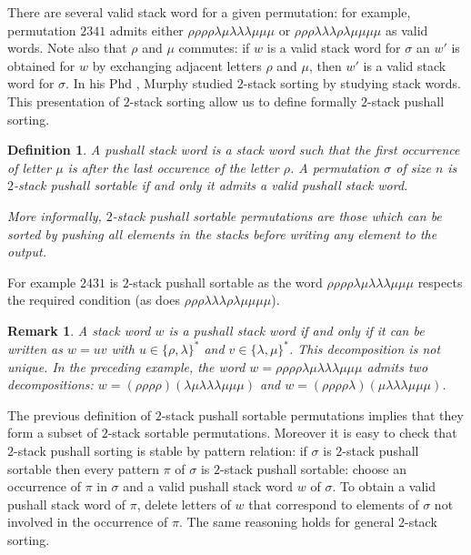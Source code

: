 \documentclass[11pt]{article}
\newtheorem{rem}[thm]{Remark}
\newtheorem{defn}[thm]{Definition}
\begin{document}
There are several valid stack word for a given permutation: for example, permutation $2341$ admits either $\rho\rho\rho\rho\lambda\mu\lambda\lambda\lambda\mu\mu\mu$ or $\rho\rho\rho\lambda\lambda\lambda\rho\lambda\mu\mu\mu\mu$ as valid words.
Note also that $\rho$ and $\mu$ commutes: if $w$ is a valid stack word for $\sigma$ an $w'$ is obtained for $w$ by exchanging adjacent letters $\rho$ and $\mu$, then $w'$ is a valid stack word for $\sigma$. 
In his Phd \cite{Murphy02}, Murphy studied $2$-stack sorting by studying stack words. 
This presentation of $2$-stack sorting allow us to define formally $2$-stack pushall sorting.

\begin{defn}
A {\em pushall} stack word is a stack word such that the first occurrence of letter $\mu$ is after the last occurence of the letter $\rho$.
A permutation $\sigma$ of size $n$ is $2$-stack pushall sortable if and only it admits a valid pushall stack word.

More informally, $2$-stack pushall sortable permutations are those which can be sorted by pushing all elements in the stacks before writing any element to the output.
\end{defn}

For example $2431$ is $2$-stack pushall sortable as the word $\rho\rho\rho\rho\lambda\mu\lambda\lambda\lambda\mu\mu\mu$ respects the required condition (as does $\rho\rho\rho\lambda\lambda\lambda\rho\lambda\mu\mu\mu\mu$). 

\begin{rem}\label{rem:decompoNonUnique}
A stack word $w$ is a pushall stack word if and only if it can be written as $w = uv$ with $u \in \{\rho,\lambda\}^{*}$ and $v \in \{\lambda,\mu\}^{*}$. This decomposition is not unique.
In the preceding example, the word $w = \rho\rho\rho\rho\lambda\mu\lambda\lambda\lambda\mu\mu\mu$ admits two decompositions: $w = (\rho\rho\rho\rho)(\lambda\mu\lambda\lambda\lambda\mu\mu\mu)$ and $w = (\rho\rho\rho\rho\lambda)(\mu\lambda\lambda\lambda\mu\mu\mu)$.
\end{rem}


The previous definition of $2$-stack pushall sortable permutations implies that they form a subset of $2$-stack sortable permutations. 
Moreover it is easy to check that $2$-stack pushall sorting is stable by pattern relation: if $\sigma$ is $2$-stack pushall sortable then every pattern $\pi$ of $\sigma $ is $2$-stack pushall sortable: choose an occurrence of $\pi$ in $\sigma$ and a valid pushall stack word $w$ of $\sigma$. 
To obtain a valid pushall stack word of $\pi$, delete letters of $w$ that correspond to elements of $\sigma$ not involved in the occurrence of $\pi$. 
The same reasoning holds for general $2$-stack sorting.
\end{document}
